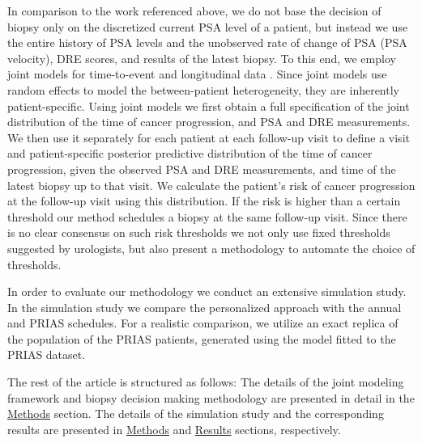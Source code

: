 In comparison to the work referenced above, we do not base the decision of biopsy only on the discretized current PSA level of a patient, but instead we use the entire history of PSA levels and the unobserved rate of change of PSA (PSA velocity), DRE scores, and results of the latest biopsy. To this end, we employ joint models for time-to-event and longitudinal data \cite{tsiatis2004joint,rizopoulos2012joint}. Since joint models use random effects \cite{laird1982random} to model the between-patient heterogeneity, they are inherently patient-specific. Using joint models we first obtain a full specification of the joint distribution of the time of cancer progression, and PSA and DRE measurements. We then use it separately for each patient at each follow-up visit to define a visit and patient-specific posterior predictive distribution of the time of cancer progression, given the observed PSA and DRE measurements, and time of the latest biopsy up to that visit. We calculate the patient's risk of cancer progression at the follow-up visit using this distribution. If the risk is higher than a certain threshold our method schedules a biopsy at the same follow-up visit. Since there is no clear consensus on such risk thresholds we not only use fixed thresholds suggested by urologists, but also present a methodology to automate the choice of thresholds. 

In order to evaluate our methodology we conduct an extensive simulation study. In the simulation study we compare the personalized approach with the annual and PRIAS schedules. For a realistic comparison, we utilize an exact replica of the population of the PRIAS patients, generated using the model fitted to the PRIAS dataset.

The rest of the article is structured as follows: The details of the joint modeling framework and biopsy decision making methodology are presented in detail in the \hyperref[sec:methods]{Methods} section. The details of the simulation study and the corresponding results are presented in \hyperref[sec:methods]{Methods} and \hyperref[sec:results]{Results} sections, respectively.